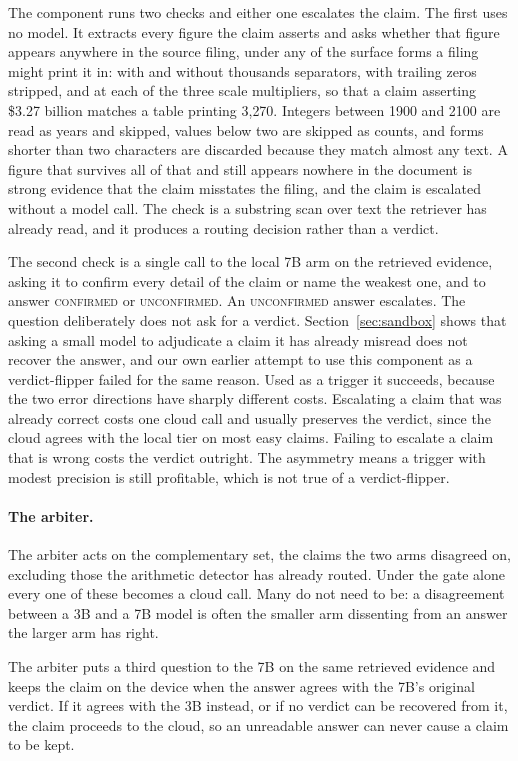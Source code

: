 \documentclass{article}
\begin{document}
The component runs two checks and either one escalates the claim. The first uses no model.
It extracts every figure the claim asserts and asks whether that figure appears anywhere in
the source filing, under any of the surface forms a filing might print it in: with and
without thousands separators, with trailing zeros stripped, and at each of the three scale
multipliers, so that a claim asserting \$3.27 billion matches a table printing 3{,}270.
Integers between 1900 and 2100 are read as years and skipped, values below two are skipped
as counts, and forms shorter than two characters are discarded because they match almost any
text. A figure that survives all of that and still appears nowhere in the document is strong
evidence that the claim misstates the filing, and the claim is escalated without a model
call. The check is a substring scan over text the retriever has already read, and it
produces a routing decision rather than a verdict.

The second check is a single call to the local 7B arm on the retrieved evidence, asking it
to confirm every detail of the claim or name the weakest one, and to answer
\textsc{confirmed} or \textsc{unconfirmed}. An \textsc{unconfirmed} answer escalates. The
question deliberately does not ask for a verdict. Section~\ref{sec:sandbox} shows that
asking a small model to adjudicate a claim it has already misread does not recover the
answer, and our own earlier attempt to use this component as a verdict-flipper failed for
the same reason. Used as a trigger it succeeds, because the two error directions have
sharply different costs. Escalating a claim that was already correct costs one cloud call
and usually preserves the verdict, since the cloud agrees with the local tier on most easy
claims. Failing to escalate a claim that is wrong costs the verdict outright. The asymmetry
means a trigger with modest precision is still profitable, which is not true of a
verdict-flipper.

\paragraph{The arbiter.}
The arbiter acts on the complementary set, the claims the two arms disagreed on, excluding
those the arithmetic detector has already routed. Under the gate alone every one of these
becomes a cloud call. Many do not need to be: a disagreement between a 3B and a 7B model is
often the smaller arm dissenting from an answer the larger arm has right.

The arbiter puts a third question to the 7B on the same retrieved evidence and keeps the
claim on the device when the answer agrees with the 7B's original verdict. If it agrees with
the 3B instead, or if no verdict can be recovered from it, the claim proceeds to the cloud,
so an unreadable answer can never cause a claim to be kept.
\end{document}
